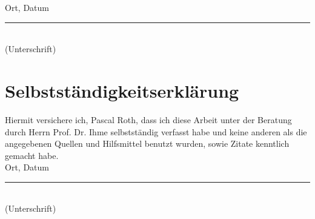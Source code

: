 Ort, Datum \hfill \rule{5cm}{0.4pt} \\
\hfill (Unterschrift)

\newpage
\section*{Selbstständigkeitserklärung}
Hiermit versichere ich, Pascal Roth, dass ich diese Arbeit unter der Beratung durch Herrn Prof. Dr. Ihme selbstständig verfasst habe und keine anderen als die angegebenen Quellen und Hilfsmittel benutzt wurden, sowie Zitate kenntlich gemacht habe. \\[2cm]

Ort, Datum \hfill \rule{5cm}{0.4pt} \\
\hfill (Unterschrift)